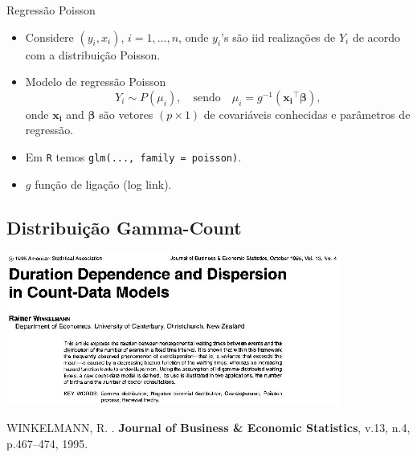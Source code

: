 \documentclass[10pt, aspectratio=169]{beamer}\usepackage[]{graphicx}\usepackage[]{color}
\begin{document}
\begin{frame}{Regressão Poisson}
\begin{itemize}
\item Considere $(y_i, x_i)$, $i = 1,\ldots, n$, onde $y_i$'s são iid 
realizações de $Y_i$ de acordo com a distribuição Poisson.
\vspace{0,5cm}
\item Modelo de regressão Poisson
$$Y_i \sim P(\mu_i), \quad  \text{sendo} \quad \mu_i = g^{-1}(\boldsymbol{x_i}^{\top} \boldsymbol{\beta}),$$
onde $\boldsymbol{x_i}$ and $\boldsymbol{\beta}$ são vetores $(p \times 1)$
de covariáveis conhecidas e parâmetros de regressão.
\vspace{0,5cm}
\item Em \texttt{R} temos \texttt{glm(..., family = poisson)}.
\vspace{0,5cm}
\item $g$ função de ligação (log link).
\end{itemize}
\end{frame}

\subsection{Distribuição Gamma-Count}

\begin{frame}
  \begin{center}
    \includegraphics[width=11cm]{images/winkelman95.jpeg}
  \end{center}
  \begin{thebibliography}{99}
    \MakeUppercase{Winkelmann, R.}
    .
    \textbf{Journal of Business \& Economic Statistics}, v.13, n.4,
    p.467--474, 1995.
  \end{thebibliography}
\end{frame}
\end{document}

